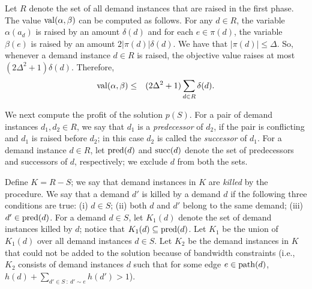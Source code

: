 \documentclass[11pt]{article}
\newcommand{\mypath} {{\rm path}}
\newcommand{\val} {{\rm val}}
\newcommand{\mypred} {{\rm pred}}
\newcommand{\mysucc} {{\rm succ}}
\begin{document}
Let $R$ denote the set of all demand instances that are raised in the first phase.
The value $\val(\alpha,\beta)$ can be computed as follows.
For any $d\in R$, the variable $\alpha(a_d)$ is raised by an amount $\delta(d)$
and for each $e\in \pi(d)$, the variable $\beta(e)$ is raised by an amount $2|\pi(d)|\delta(d)$.
We have that $|\pi(d)|\leq \Delta$.
So, whenever a demand instance $d\in R$ is raised, the objective value raises at most $(2\Delta^2+1)\delta(d)$.
Therefore,
\begin{eqnarray}
\label{eqn:HHH}
\val(\alpha,\beta) &\leq& (2\Delta^2+1)\sum_{d\in R} \delta(d).
\end{eqnarray}

We next compute the profit of the solution $p(S)$.
For a pair of demand instances $d_1, d_2\in R$, we say that $d_1$ is a {\em predecessor} of $d_2$,
if the pair is conflicting and $d_1$ is raised before $d_2$;
in this case $d_2$ is called the {\em successor} of $d_1$.
For a demand instance $d\in R$, let $\mypred(d)$ and $\mysucc(d)$ denote the set of predecessors and successors of $d$,
respectively; we exclude $d$ from both the sets.

Define $K=R-S$; we say that demand instances in $K$ are {\em killed} by the procedure.
We say that a demand $d'$ is killed by a demand $d$ if the following three conditions are true: (i) $d\in S$;
(ii) both $d$ and $d'$ belong to the same demand;  (iii) $d'\in \mypred(d)$.
For a demand $d\in S$, let $K_1(d)$ denote the set of demand instances killed by $d$; 
notice that $K_1(d)\subseteq \mypred(d)$.
Let $K_1$ be the union of $K_1(d)$ over all demand instances $d\in S$.
Let $K_2$ be the demand instances in $K$ that could not be added to the solution because of bandwidth constraints
(i.e., $K_2$ consists of demand instances $d$ such that for some edge $e\in \mypath(d)$, 
$h(d)+\sum_{d'\in S~:~d'\sim e} h(d') > 1$).
\end{document}
